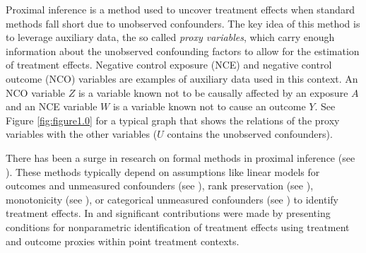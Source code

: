 Proximal inference is a method used to uncover treatment effects when standard methods fall short due to unobserved confounders. The key idea of this method is to leverage auxiliary data, the so called \textit{proxy variables}, which carry enough information about the unobserved confounding factors to allow for the estimation of treatment effects. Negative control exposure (NCE) and negative control outcome (NCO) variables are examples of auxiliary data used in this context. An NCO variable $Z$ is a variable known not to be
causally affected by an exposure $A$ and an NCE variable $W$ is a variable known not to cause an outcome $Y$. See Figure \ref{fig:figure1.0} for a typical graph that shows the relations of the proxy variables with the other variables ($U$ contains the unobserved confounders). 

There has been a surge in research on formal methods in proximal inference (see \cite{203,204,205,206,111}). These methods typically depend on assumptions like linear models for outcomes and unmeasured confounders (see \cite{112,113,114,115}), rank preservation (see \cite{116}), monotonicity (see \cite{117}), or categorical unmeasured confounders (see \cite{206}) to identify treatment effects. In \cite{205} and \cite{120} significant contributions were made by presenting conditions for nonparametric identification of treatment effects using treatment and outcome proxies within point treatment contexts.

